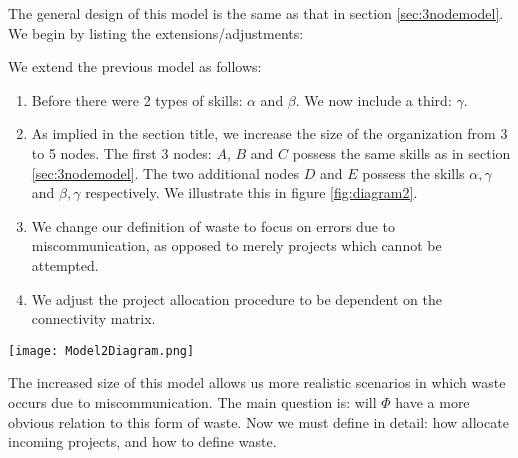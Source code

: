 The general design of this model is the same as that in section \ref{sec:3nodemodel}. We begin by listing the extensions/adjustments:



We extend the previous model as follows: 
\begin{enumerate}


	\item Before there were 2 types of skills: $\alpha$ and $\beta$. We now include a third: $\gamma$.
	
	\item As implied in the section title, we increase the size of the organization from 3 to 5 nodes. The first 3 nodes: $A$, $B$ and $C$ possess the same skills as in section \ref{sec:3nodemodel}. The two additional nodes $D$ and $E$ possess the skills $\alpha, \gamma$ and $\beta, \gamma$ respectively. We illustrate this in figure \ref{fig:diagram2}.
	
	\item We change our definition of waste to focus on errors due to miscommunication, as opposed to merely projects which cannot be attempted.
	
	\item We adjust the project allocation procedure to be dependent on the connectivity matrix.
\end{enumerate}

\begin{SCfigure}
	\centering	
	\texttt{[image: Model2Diagram.png]}
	\caption{We have 3 types of nodes: skill types ($\alpha$, $\beta$, and $\gamma$), teams ($A$, $B$, $C$, $D$, and $E$), and incoming project alerts ($P_\alpha$, $P_\beta$ and $P_\gamma$). If a team node is joined to a skill node by an edge, then the team possesses that skill. The teams receive inputs from the incoming project alert nodes, but the dependence is strictly one directional.
		Certain teams are connected, indicating that they are actively communicating with each other so to distribute work efficiently. Note that in this figure, we have 2 disconnected clusters of teams. This will give rise to waste.}
	\label{fig:diagram2}
\end{SCfigure}

The increased size of this model allows us more realistic scenarios in which waste occurs due to miscommunication. The main question is: will $\Phi$ have a more obvious relation to this form of waste. Now we must define in detail: how allocate incoming projects, and how to define waste.


